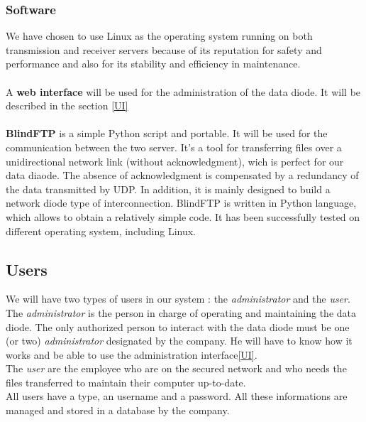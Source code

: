 \documentclass[a4paper,10pt]{article}
\begin{document}
\subsubsection{Software}
We have chosen to use Linux as the operating system running on both transmission and receiver servers because of its reputation for safety and performance and also for its stability and efficiency in maintenance.

\paragraph{} A \textbf{web interface} will be used for the administration of the data diode. It will be described in the section \ref{UI}

\paragraph{} \textbf{BlindFTP} is a simple Python script and portable. It will be used for the communication between the two server. It's a tool for transferring files over a unidirectional network link (without acknowledgment), wich is perfect for our data diaode. The absence of acknowledgment is compensated by a redundancy of the data transmitted by UDP. In addition, it is mainly designed to build a network diode type of interconnection. BlindFTP is written in Python language, which allows to obtain a relatively simple code. It has been successfully tested on different operating system, including Linux.

\subsection{Users} 
We will have two types of users in our system : the \textit{administrator} and the \textit{user}.\\

The \textit{administrator} is the person in charge of operating and maintaining the data diode. The only authorized person to interact with the data diode must be one (or two) \textit{administrator} designated by the company. He will have to know how it works and be able to use the administration interface\ref{UI}.\\

The \textit{user} are the employee who are on the secured network and who needs the files
transferred to maintain their computer up-to-date.\\

All users have a type, an username and a password. All these informations are
managed and stored in a database by the company.
\end{document}
